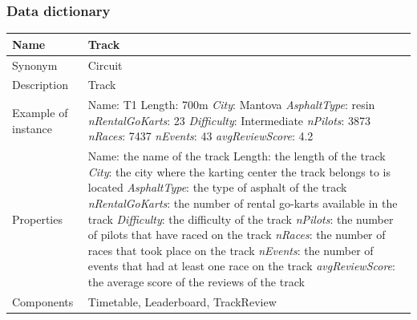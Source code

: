 \documentclass{beamer}
\begin{document}
\begin{frame}
\frametitle{Data dictionary}
\begin{table}
\tiny
\begin{tabular}{|p{2cm}|p{6cm}|}
\hline
Name & \textbf{Track} \\
\hline
Synonym & Circuit \\
\hline
Description & Track \\
\hline
Example of instance &
Name: T1 \newline
Length: 700m \newline
\textit{City}: Mantova \newline
\textit{AsphaltType}: resin \newline
\textit{nRentalGoKarts}: 23 \newline
\textit{Difficulty}: Intermediate \newline
\textit{nPilots}: 3873 \newline
\textit{nRaces}: 7437 \newline
\textit{nEvents}: 43 \newline
\textit{avgReviewScore}: 4.2 \\
\hline
Properties &
Name: the name of the track \newline
Length: the length of the track \newline
\textit{City}: the city where the karting center the track belongs to is located \newline
\textit{AsphaltType}: the type of asphalt of the track \newline
\textit{nRentalGoKarts}: the number of rental go-karts available in the track \newline
\textit{Difficulty}: the difficulty of the track \newline
\textit{nPilots}: the number of pilots that have raced on the track \newline
\textit{nRaces}: the number of races that took place on the track \newline
\textit{nEvents}: the number of events that had at least one race on the track \newline
\textit{avgReviewScore}: the average score of the reviews of the track \\
\hline
Components & 
Timetable, Leaderboard, TrackReview \\
\hline
\end{tabular}
\end{table}
\end{frame}
\end{document}
